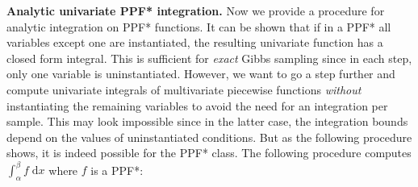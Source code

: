 \documentclass[letterpaper]{article}
\newcommand{\dd}{\;\mathrm{d}} %
\begin{document}
\noindent
{\bf Analytic univariate PPF* integration.} 
Now we provide a procedure for analytic integration on PPF* functions.
It can be shown that if in a PPF* all variables except one are instantiated, 
the resulting univariate function has a closed form integral.  
This is sufficient for \emph{exact} Gibbs sampling since in each step, only one variable is uninstantiated.
However, we want to go a step further and compute univariate integrals of multivariate piecewise functions  
\emph{without} instantiating the remaining variables to avoid the need
for an integration per sample.
This may look impossible since in the latter case, the integration bounds depend on the values of uninstantiated conditions. 
But as the following procedure shows, it is indeed possible for the PPF* class.
The following procedure computes $\int_{\alpha}^\beta f \dd x$ where $f$ is a PPF*:
\end{document}
